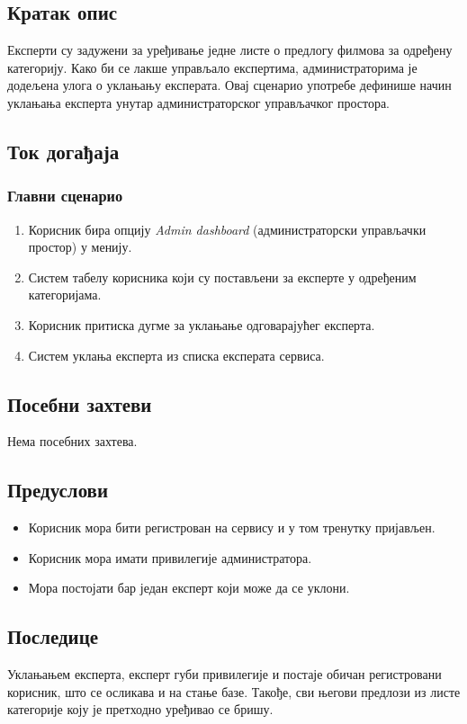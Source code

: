 \subsection{Кратак опис}

Експерти су задужени за уређивање једне листе о предлогу филмова за одређену категорију. Како
би се лакше управљало експертима, администраторима је додељена улога о уклањању експерата.
Овај сценарио употребе дефинише начин уклањања експерта унутар администраторског управљачког
простора.

\subsection{Ток догађаја}

\subsubsection{Главни сценарио}

\begin{enumerate}
    \item Корисник бира опцију \textit{Admin dashboard} (администраторски управљачки простор) у менију.
    \item Систем табелу корисника који су постављени за експерте у одређеним категоријама.
    \item Корисник притиска дугме за уклањање одговарајућег експерта.
    \item Систем уклања експерта из списка експерата сервиса.
\end{enumerate}

\subsection{Посебни захтеви}

Нема посебних захтева.

\subsection{Предуслови}

\begin{itemize}
    \item Корисник мора бити регистрован на сервису и у том тренутку пријављен.
    \item Корисник мора имати привилегије администратора.
    \item Мора постојати бар један експерт који може да се уклони.
\end{itemize}

\subsection{Последице}

Уклањањем експерта, експерт губи привилегије и постаје обичан регистровани корисник, што се
осликава и на стање базе. Такође, сви његови предлози из листе категорије коју је претходно
уређивао се бришу.
